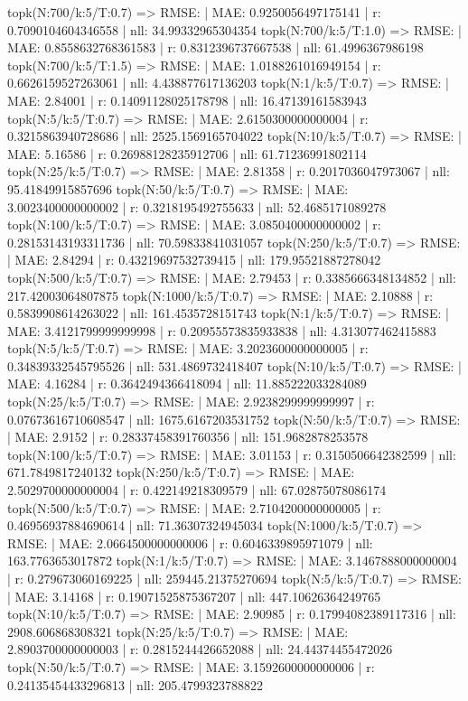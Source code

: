 topk(N:700/k:5/T:0.7) => RMSE: | MAE: 0.9250056497175141 | r: 0.7090104604346558 | nll: 34.99332965304354
topk(N:700/k:5/T:1.0) => RMSE: | MAE: 0.8558632768361583 | r: 0.8312396737667538 | nll: 61.4996367986198
topk(N:700/k:5/T:1.5) => RMSE: | MAE: 1.0188261016949154 | r: 0.6626159527263061 | nll: 4.438877617136203
topk(N:1/k:5/T:0.7) => RMSE: | MAE: 2.84001 | r: 0.14091128025178798 | nll: 16.47139161583943
topk(N:5/k:5/T:0.7) => RMSE: | MAE: 2.6150300000000004 | r: 0.3215863940728686 | nll: 2525.1569165704022
topk(N:10/k:5/T:0.7) => RMSE: | MAE: 5.16586 | r: 0.26988128235912706 | nll: 61.71236991802114
topk(N:25/k:5/T:0.7) => RMSE: | MAE: 2.81358 | r: 0.2017036047973067 | nll: 95.41849915857696
topk(N:50/k:5/T:0.7) => RMSE: | MAE: 3.0023400000000002 | r: 0.3218195492755633 | nll: 52.4685171089278
topk(N:100/k:5/T:0.7) => RMSE: | MAE: 3.0850400000000002 | r: 0.28153143193311736 | nll: 70.59833841031057
topk(N:250/k:5/T:0.7) => RMSE: | MAE: 2.84294 | r: 0.43219697532739415 | nll: 179.95521887278042
topk(N:500/k:5/T:0.7) => RMSE: | MAE: 2.79453 | r: 0.3385666348134852 | nll: 217.42003064807875
topk(N:1000/k:5/T:0.7) => RMSE: | MAE: 2.10888 | r: 0.5839908614263022 | nll: 161.4535728151743
topk(N:1/k:5/T:0.7) => RMSE: | MAE: 3.4121799999999998 | r: 0.20955573835933838 | nll: 4.313077462415883
topk(N:5/k:5/T:0.7) => RMSE: | MAE: 3.2023600000000005 | r: 0.34839332545795526 | nll: 531.4869732418407
topk(N:10/k:5/T:0.7) => RMSE: | MAE: 4.16284 | r: 0.3642494366418094 | nll: 11.885222033284089
topk(N:25/k:5/T:0.7) => RMSE: | MAE: 2.9238299999999997 | r: 0.07673616710608547 | nll: 1675.6167203531752
topk(N:50/k:5/T:0.7) => RMSE: | MAE: 2.9152 | r: 0.28337458391760356 | nll: 151.9682878253578
topk(N:100/k:5/T:0.7) => RMSE: | MAE: 3.01153 | r: 0.3150506642382599 | nll: 671.7849817240132
topk(N:250/k:5/T:0.7) => RMSE: | MAE: 2.5029700000000004 | r: 0.422149218309579 | nll: 67.02875078086174
topk(N:500/k:5/T:0.7) => RMSE: | MAE: 2.7104200000000005 | r: 0.46956937884690614 | nll: 71.36307324945034
topk(N:1000/k:5/T:0.7) => RMSE: | MAE: 2.0664500000000006 | r: 0.6046339895971079 | nll: 163.7763653017872
topk(N:1/k:5/T:0.7) => RMSE: | MAE: 3.1467888000000004 | r: 0.279673060169225 | nll: 259445.21375270694
topk(N:5/k:5/T:0.7) => RMSE: | MAE: 3.14168 | r: 0.19071525875367207 | nll: 447.10626364249765
topk(N:10/k:5/T:0.7) => RMSE: | MAE: 2.90985 | r: 0.17994082389117316 | nll: 2908.606868308321
topk(N:25/k:5/T:0.7) => RMSE: | MAE: 2.8903700000000003 | r: 0.2815244426652088 | nll: 24.44374455472026
topk(N:50/k:5/T:0.7) => RMSE: | MAE: 3.1592600000000006 | r: 0.24135454433296813 | nll: 205.4799323788822
